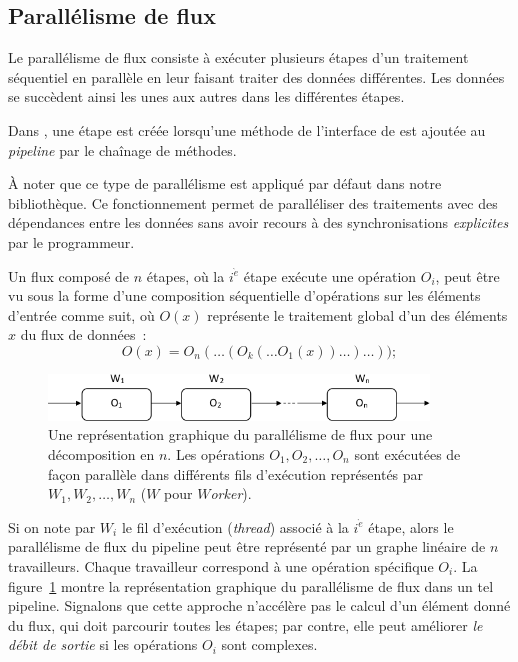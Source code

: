 \subsection{Parall\'elisme de flux}
\label{ParallelismeDuFlux.sect}

Le parall\'elisme de flux consiste \`a ex\'ecuter plusieurs \'etapes d'un traitement s\'equentiel en parall\`ele en leur faisant traiter des donn\'ees diff\'erentes. Les donn\'ees se succ\`edent ainsi les unes aux autres dans les diff\'erentes \'etapes.

Dans , une {\'etape} est cr\'e\'ee lorsqu'une m\'ethode de l'interface de  est ajout\'ee au \emph{pipeline} par le cha\^inage de m\'ethodes.

\`A noter que ce type de parall\'elisme est appliqu\'e par d\'efaut dans notre biblioth\`eque. 
%
Ce fonctionnement permet de parall\'eliser des traitements avec des d\'ependances entre les donn\'ees sans avoir recours \`a des synchronisations \emph{explicites} par le programmeur. 

\goodbreak
\begin{samepage}
Un flux compos\'e de $n$ {étapes}, o\`u la $i^{\grave e}$ étape ex\'ecute une op\'eration $O_i$, peut \^etre vu sous la forme d'une composition s\'equentielle d'op\'erations sur les \'el\'ements d'entr\'ee comme suit, o\`u $O(x)$ repr\'esente le traitement global d'un des \'el\'ements $x$ du flux de données~: 
%
\[
	O(x) = O_n( \ldots (O_k( \ldots O_1(x)) \ldots ) \ldots ));
\]
\end{samepage}


\begin{figure}

\centering
     \includegraphics[width=0.9\textwidth]{Figures/ParallelismeDuFlux.png}
      \caption[Une repr\'esentation graphique du parall\'elisme de flux en \ppff.]{Une repr\'esentation graphique du parall\'elisme de flux pour une d\'ecomposition en $n$. Les op\'erations $O_1, O_2, \ldots, O_n$ sont ex\'ecut\'ees de fa\c{c}on parall\`ele dans diff\'erents fils d'ex\'ecution représentés par $W_1, W_2, \ldots, W_n$ ($W$ pour \emph{$W$orker}).}
       \label{ParallelismeDuFlux.fig}
\end{figure}


Si on note par $W_i$ le fil d'ex\'ecution (\emph{thread}) associ\'e à la $i^{\grave e}$ {étape}, alors
le parall\'elisme de flux du pipeline peut \^etre repr\'esent\'e par un graphe lin\'eaire de $n$ travailleurs. Chaque travailleur correspond \`a une op\'eration sp\'ecifique $O_i$. La figure~\ref{ParallelismeDuFlux.fig} montre la repr\'esentation graphique du parall\'elisme de flux dans un tel pipeline. Signalons que cette approche n'acc\'el\`ere pas le calcul d'un \'el\'ement donné du flux, qui doit parcourir toutes les étapes; par contre, elle peut am\'eliorer \emph{le d\'ebit de sortie} si les opérations $O_i$ sont complexes.


